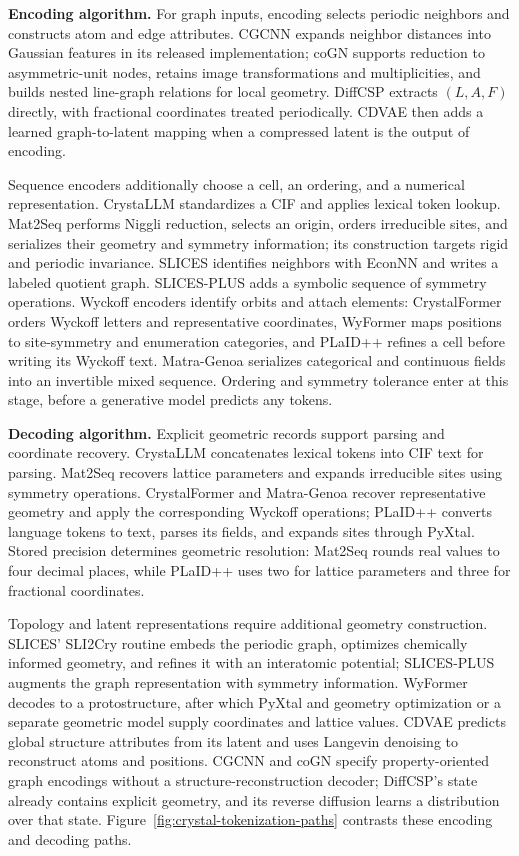 \textbf{Encoding algorithm.}
For graph inputs, encoding selects periodic neighbors and constructs atom and edge attributes. CGCNN expands neighbor distances into Gaussian features in its released implementation; coGN supports reduction to asymmetric-unit nodes, retains image transformations and multiplicities, and builds nested line-graph relations for local geometry. DiffCSP extracts $(L,A,F)$ directly, with fractional coordinates treated periodically. CDVAE then adds a learned graph-to-latent mapping when a compressed latent is the output of encoding.

Sequence encoders additionally choose a cell, an ordering, and a numerical representation. CrystaLLM standardizes a CIF and applies lexical token lookup. Mat2Seq performs Niggli reduction, selects an origin, orders irreducible sites, and serializes their geometry and symmetry information; its construction targets rigid and periodic invariance. SLICES identifies neighbors with EconNN and writes a labeled quotient graph. SLICES-PLUS adds a symbolic sequence of symmetry operations. Wyckoff encoders identify orbits and attach elements: CrystalFormer orders Wyckoff letters and representative coordinates, WyFormer maps positions to site-symmetry and enumeration categories, and PLaID++ refines a cell before writing its Wyckoff text. Matra-Genoa serializes categorical and continuous fields into an invertible mixed sequence. Ordering and symmetry tolerance enter at this stage, before a generative model predicts any tokens.

\textbf{Decoding algorithm.}
Explicit geometric records support parsing and coordinate recovery. CrystaLLM concatenates lexical tokens into CIF text for parsing. Mat2Seq recovers lattice parameters and expands irreducible sites using symmetry operations. CrystalFormer and Matra-Genoa recover representative geometry and apply the corresponding Wyckoff operations; PLaID++ converts language tokens to text, parses its fields, and expands sites through PyXtal. Stored precision determines geometric resolution: Mat2Seq rounds real values to four decimal places, while PLaID++ uses two for lattice parameters and three for fractional coordinates.

Topology and latent representations require additional geometry construction. SLICES' SLI2Cry routine embeds the periodic graph, optimizes chemically informed geometry, and refines it with an interatomic potential; SLICES-PLUS augments the graph representation with symmetry information. WyFormer decodes to a protostructure, after which PyXtal and geometry optimization or a separate geometric model supply coordinates and lattice values. CDVAE predicts global structure attributes from its latent and uses Langevin denoising to reconstruct atoms and positions. CGCNN and coGN specify property-oriented graph encodings without a structure-reconstruction decoder; DiffCSP's state already contains explicit geometry, and its reverse diffusion learns a distribution over that state. Figure~\ref{fig:crystal-tokenization-paths} contrasts these encoding and decoding paths.

